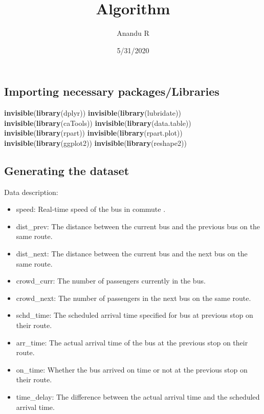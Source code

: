 \documentclass[
]{article}
\title{Algorithm}
\author{Anandu R}
\date{5/31/2020}
\newenvironment{Shaded}{\begin{snugshade}}{\end{snugshade}}
\newcommand{\KeywordTok}[1]{\textcolor[rgb]{0.13,0.29,0.53}{\textbf{#1}}}
\newcommand{\NormalTok}[1]{#1}
\providecommand{\tightlist}{%
  \setlength{\itemsep}{0pt}\setlength{\parskip}{0pt}}
\begin{document}
\maketitle

\hypertarget{importing-necessary-packageslibraries}{%
\subsection{Importing necessary
packages/Libraries}\label{importing-necessary-packageslibraries}}

\begin{Shaded}
\begin{Highlighting}[]
\KeywordTok{invisible}\NormalTok{(}\KeywordTok{library}\NormalTok{(dplyr))}
\KeywordTok{invisible}\NormalTok{(}\KeywordTok{library}\NormalTok{(lubridate))}
\KeywordTok{invisible}\NormalTok{(}\KeywordTok{library}\NormalTok{(caTools))}
\KeywordTok{invisible}\NormalTok{(}\KeywordTok{library}\NormalTok{(data.table))}
\KeywordTok{invisible}\NormalTok{(}\KeywordTok{library}\NormalTok{(rpart))}
\KeywordTok{invisible}\NormalTok{(}\KeywordTok{library}\NormalTok{(rpart.plot))}
\KeywordTok{invisible}\NormalTok{(}\KeywordTok{library}\NormalTok{(ggplot2))}
\KeywordTok{invisible}\NormalTok{(}\KeywordTok{library}\NormalTok{(reshape2))}
\end{Highlighting}
\end{Shaded}

\hypertarget{generating-the-dataset}{%
\subsection{Generating the dataset}\label{generating-the-dataset}}

Data description:

\begin{itemize}
\tightlist
\item
  speed: Real-time speed of the bus in commute .
\item
  dist\_prev: The distance between the current bus and the previous bus
  on the same route.
\item
  dist\_next: The distance between the current bus and the next bus on
  the same route.
\item
  crowd\_curr: The number of passengers currently in the bus.
\item
  crowd\_next: The number of passengers in the next bus on the same
  route.
\item
  schd\_time: The scheduled arrival time specified for bus at previous
  stop on their route.
\item
  arr\_time: The actual arrival time of the bus at the previous stop on
  their route.
\item
  on\_time: Whether the bus arrived on time or not at the previous stop
  on their route.
\item
  time\_delay: The difference between the actual arrival time and the
  scheduled arrival time.
\end{itemize}
\end{document}
